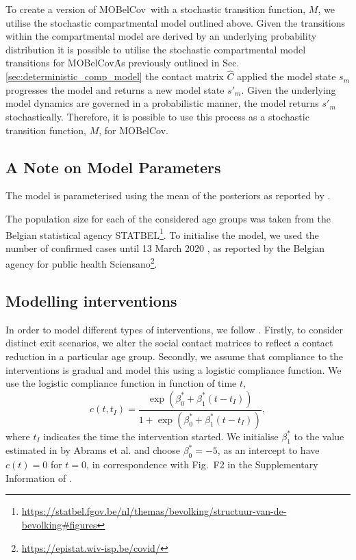 \documentclass{article}
\renewcommand{\cite}[1]{\citep{#1}}
\newcommand{\momdpname}{MOBelCov}
\begin{document}
To create a version of \momdpname\ with a stochastic transition function, $M$, we utilise the stochastic compartmental model outlined above. Given the transitions within the compartmental model are derived by an underlying probability distribution it is possible to utilise the stochastic compartmental model transitions for \momdpname\. As previously outlined in Sec. \ref{sec:deterministic_comp_model} the contact matrix $\hat{C}$ applied the model state $s_{m}$ progresses the model and returns a new model state $s'_{m}$. Given the underlying model dynamics are governed in a probabilistic manner, the model returns $s'_{m}$ stochastically. Therefore, it is possible to use this process as a stochastic transition function, $M$, for \momdpname. 

\subsection{A Note on Model Parameters}
\label{sec:compartment-model-parameters}

The model is parameterised using the mean of the posteriors as reported by \citet{abrams2021modelling}.

The population size for each of the considered age groups was taken from the Belgian statistical agency STATBEL\footnote{\url{https://statbel.fgov.be/nl/themas/bevolking/structuur-van-de-bevolking\#figures}}. To initialise the model, we used the number of confirmed cases until 13 March 2020 \cite{abrams2021modelling}, as reported by the Belgian agency for public health Sciensano\footnote{\url{https://epistat.wiv-isp.be/covid/}}.

\subsection{Modelling interventions}
\label{sec:compliance-function}
In order to model different types of interventions, we follow \citet{abrams2021modelling}. Firstly, to consider distinct exit scenarios, we alter the social contact matrices to reflect a contact reduction in a particular age group. Secondly, we assume that compliance to the interventions is gradual and model this using a logistic compliance function. We use the logistic compliance function in function of time $t$,
%
\begin{equation}
c(t,t_I) = \frac{\exp(\beta^*_0 + \beta^*_1(t-t_I))}{1+\exp(\beta^*_0 + \beta^*_1(t-t_I))},
\end{equation}
%
where $t_I$ indicates the time the intervention started. We initialise $\beta^*_1$ to the value estimated in by Abrams et al. and choose $\beta^*_0=-5$, as an intercept to have $c(t)=0$ for $t=0$, in correspondence with Fig.~F2 in the Supplementary Information of \citet{abrams2021modelling}.
\end{document}
